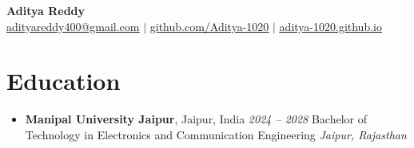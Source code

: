 \documentclass[letterpaper,11pt]{article}
\begin{document}
\begin{center}
    \textbf{\Huge Aditya Reddy} \\ \vspace{1pt}
    \small \href{mailto:adityareddy400@gmail.com}{\underline{adityareddy400@gmail.com}} $|$
    \href{https://github.com/Aditya-1020}{\underline{github.com/Aditya-1020}} $|$
    \href{https://aditya-1020.github.io}{\underline{aditya-1020.github.io}}
\end{center}


\section{Education}
\begin{itemize}[leftmargin=*, itemsep=1pt]
  \item \textbf{Manipal University Jaipur}, Jaipur, India \hfill \textit{2024 -- 2028}  
  \newline Bachelor of Technology in Electronics and Communication Engineering \hfill \textit{Jaipur, Rajasthan}  
\end{itemize}

\end{document}

